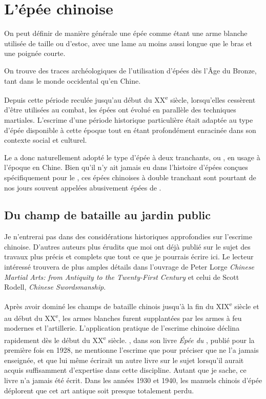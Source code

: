 \chapter{L'épée chinoise}\label{ch:epeechinoise}

On peut définir de manière générale une épée comme étant une arme blanche utilisée de taille ou d'estoc, avec une lame au moins aussi longue que le bras et une poignée courte.

On trouve des traces archéologiques de l'utilisation d'épées dès l'Âge du Bronze, tant dans le monde occidental qu'en Chine.

Depuis cette période reculée jusqu'au début du XX\textsuperscript{e} siècle, lorsqu'elles cessèrent d'être utilisées au combat, les épées ont évolué en parallèle des techniques martiales. 
L'escrime d'une période historique particulière était adaptée au type d'épée disponible à cette époque tout en étant profondément enracinée dans son contexte social et culturel.

Le \Taijijian{} a donc naturellement adopté le type d'épée à deux tranchants, ou \Jian{}, en usage à l'époque en Chine.
Bien qu'il n'y ait jamais eu dans l'histoire d'épées conçues spécifiquement pour le \Taijijian{}, ces épées chinoises à double tranchant sont pourtant de nos jours souvent appelées abusivement épées de \Taiji{}.

\section{Du champ de bataille au jardin public}
Je n'entrerai pas dans des considérations historiques approfondies sur l'escrime chinoise.
D'autres auteurs plus érudits que moi ont déjà publié sur le sujet des travaux plus précis et complets que tout ce que je pourrais écrire ici. Le lecteur intéressé trouvera de plus amples détails dans l'ouvrage de Peter Lorge \textit{Chinese Martial Arts: from Antiquity to the Twenty-First Century} et celui de Scott Rodell, \textit{Chinese Swordsmanship}. 

Après avoir dominé les champs de bataille chinois jusqu'à la fin du XIX\textsuperscript{e} siècle et au début du XX\textsuperscript{e}, les armes blanches furent supplantées par les armes à feu modernes et l'artillerie. L'application pratique de l'escrime chinoise déclina rapidement dès le début du XX\textsuperscript{e} siècle. 
\ChenWeiming{}, dans son livre \textit{\'{E}pée du \Taiji{}}, publié pour la première fois en 1928, ne mentionne l'escrime que pour préciser que \YangChengfu{} ne l'a jamais enseignée, et que lui même écrirait un autre livre sur le sujet lorsqu'il aurait acquis suffisamment d'expertise dans cette discipline. Autant que je sache, ce livre n'a jamais été écrit.
Dans les années 1930 et 1940, les manuels chinois d'épée déplorent que cet art antique soit presque totalement perdu.

